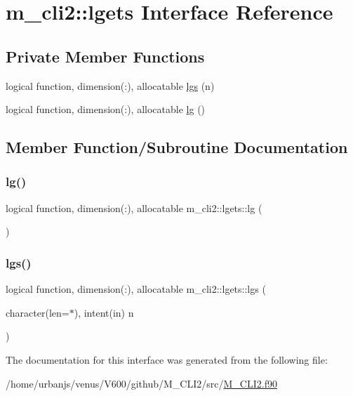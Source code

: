 \hypertarget{interfacem__cli2_1_1lgets}{}\section{m\+\_\+cli2\+:\+:lgets Interface Reference}
\label{interfacem__cli2_1_1lgets}
\subsection*{Private Member Functions}
\begin{DoxyCompactItemize}
\item 
logical function, dimension(\+:), allocatable \mbox{\hyperlink{interfacem__cli2_1_1lgets_a72669e346fc52bfe3821ddb7c96a868a}{lgs}} (n)
\item 
logical function, dimension(\+:), allocatable \mbox{\hyperlink{interfacem__cli2_1_1lgets_a7e2865540d73a3c98f82b027110cdbed}{lg}} ()
\end{DoxyCompactItemize}


\subsection{Member Function/\+Subroutine Documentation}
\mbox{\label{interfacem__cli2_1_1lgets_a7e2865540d73a3c98f82b027110cdbed}} 
\subsubsection{\texorpdfstring{lg()}{lg()}}
{\footnotesize\ttfamily logical function, dimension(\+:), allocatable m\+\_\+cli2\+::lgets\+::lg (\begin{DoxyParamCaption}{ }\end{DoxyParamCaption})\hspace{0.3cm}{\ttfamily [private]}}

\mbox{\label{interfacem__cli2_1_1lgets_a72669e346fc52bfe3821ddb7c96a868a}} 
\subsubsection{\texorpdfstring{lgs()}{lgs()}}
{\footnotesize\ttfamily logical function, dimension(\+:), allocatable m\+\_\+cli2\+::lgets\+::lgs (\begin{DoxyParamCaption}\item[{character(len=$\ast$), intent(in)}]{n }\end{DoxyParamCaption})\hspace{0.3cm}{\ttfamily [private]}}



The documentation for this interface was generated from the following file\+:\begin{DoxyCompactItemize}
\item 
/home/urbanjs/venus/\+V600/github/\+M\+\_\+\+C\+L\+I2/src/\mbox{\hyperlink{M__CLI2_8f90}{M\+\_\+\+C\+L\+I2.\+f90}}\end{DoxyCompactItemize}
